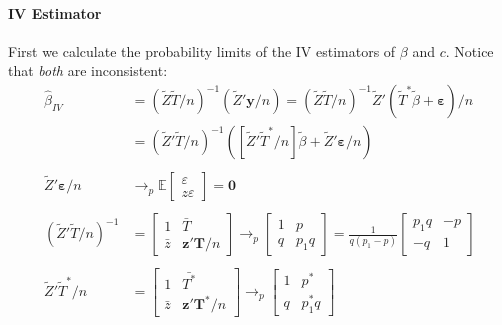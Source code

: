 \documentclass[12pt]{article}
\begin{document}
\paragraph{IV Estimator}
First we calculate the probability limits of the IV estimators of $\beta$ and $c$.
Notice that \emph{both} are inconsistent:
\begin{align*}
  \widehat{\beta}_{IV} &= \left( \widetilde{Z}\widetilde{T}/n \right)^{-1}\left(\widetilde{Z}'\mathbf{y}/n\right) =  \left( \widetilde{Z}\widetilde{T}/n \right)^{-1}\widetilde{Z}' \left( \widetilde{T}^* \widetilde{\beta} + \boldsymbol{\varepsilon} \right)/n\\
&= \left( \widetilde{Z}'\widetilde{T}/n \right)^{-1}\left( \left[\widetilde{Z}'\widetilde{T}^*/n \right] \widetilde{\beta} + \widetilde{Z}'\boldsymbol{\varepsilon}/n \right) \\ \\
  \widetilde{Z}'\boldsymbol{\varepsilon}/n &\rightarrow_p \mathbb{E}\left[
  \begin{array}{c}
    \varepsilon \\ z \varepsilon
  \end{array}
\right] = \mathbf{0}\\ \\ 
\left(\widetilde{Z}'\widetilde{T}/n\right)^{-1} &= \left[
\begin{array}{cc}
  1 & \bar{T} \\ \bar{z} & \mathbf{z}'\mathbf{T}/n
\end{array}
\right] \rightarrow_p \left[
\begin{array}{cc}
  1 & p \\ q & p_1 q
\end{array}
\right] = \frac{1}{q(p_1 - p)}\left[
\begin{array}{cc}
  p_1 q & -p \\ -q & 1
\end{array}
\right] \\ \\ 
\widetilde{Z}'\widetilde{T}^*/n &= \left[
\begin{array}{cc}
  1 & \bar{T^*} \\ \bar{z} & \mathbf{z}'\mathbf{T}^*/n
\end{array}
\right] \rightarrow_p \left[
\begin{array}{cc}
  1 & p^* \\ q & p_1^* q
\end{array}
\right] \\ \\ 

\end{align*}
\end{document}
